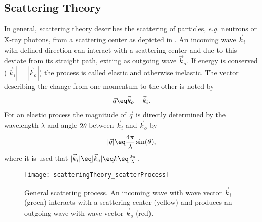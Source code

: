 \documentclass[\main/dresen_thesis.tex]{subfiles}
\begin{document}
  \subsection{Scattering Theory}\label{sec:theoreticalBackground:scattering:scatteringTheory}
    In general, scattering theory describes the scattering of particles, \textit{e.g.} neutrons or X-ray photons, from a scattering center as depicted in . An incoming wave $\vec{k}_i$ with defined direction can interact with a scattering center and due to this deviate from its straight path, exiting as outgoing wave $\vec{k}_o$.
    If energy is conserved ($|\vec{k}_i| = |\vec{k}_o|$) the process is called elastic and otherwise inelastic.
    The vector describing the change from one momentum to the other is noted by
    \begin{align}
      \vec{q} \eq \vec{k}_o - \vec{k}_i.
    \end{align}
    For an elastic process the magnitude of $\vec{q}$ is directly determined by the wavelength $\lambda$ and angle $2\theta$ between $\vec{k}_i$ and $\vec{k}_o$ by
    \begin{align}
      |\vec{q}| \eq \frac{4 \pi}{\lambda} \sin(\theta),
    \end{align}
    where it is used that $|\vec{k}_i| \eq |\vec{k}_o| \eq k \eq \frac{2 \pi}{\lambda}$.

    \begin{figure}[tb]
      \centering
      \texttt{[image: scatteringTheory\_scatterProcess]}
      \caption{\label{fig:theoreticalBackground:scattering:scatteringTheory:scatteringProcess}General scattering process. An incoming wave with wave vector $\vec{k}_i$ (green) interacts with a scattering center (yellow) and produces an outgoing wave with wave vector $\vec{k}_o$ (red).}
    \end{figure}
\end{document}
